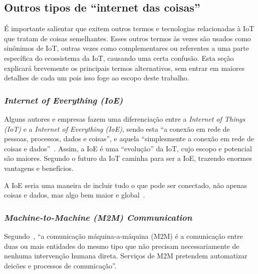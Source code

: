 \documentclass[pdftex, brazil, 12pt, twoside]{article}
\newcommand{\ingles}[1]{\textit{#1}}
\begin{document}
\subsection{Outros tipos de ``internet das coisas''}
\label{o-que-e-iot-outros-tipos}

É importante salientar que exitem outros termos e tecnologias relacionadas à
IoT que tratam de coisas semelhantes. Esses outros termos às vezes são usados
como sinônimos de IoT, outras vezes como complementares ou referentes a uma
parte específica do ecossistema da IoT, causando uma certa confusão. Esta
seção explicará brevemente os principais termos alternativos, sem entrar em
maiores detalhes de cada um pois isso foge ao escopo deste trabalho.


\subsubsection{\ingles{Internet of Everything (IoE)}}
\label{o-que-e-iot-outros-tipos-ioe}

Alguns autores e empresas fazem uma diferenciação entre a \ingles{Internet of Things (IoT)}
e a \ingles{Internet
  of Everything (IoE)}, sendo esta ``a conexão em rede de pessoas, processos,
dados e coisas'', e aquela ``simplesmente a conexão em rede de coisas
e dados''~\citep{CiscoIoEPublicSectorOpportunity,CiscoIoTVS2013,CiscoIoTFAQ2013}.
Assim, a IoE é uma ``evolução'' da IoT, cujo escopo e potencial
são maiores. Segundo \citet{HebraIoTIoE2015} o futuro da IoT caminha para
ser a IoE, trazendo enormes vantagens e benefícios.

A IoE seria uma maneira de incluir tudo o que pode ser conectado, não apenas
coisas e dados, mas algo bem maior e global~\citep{LuethIoT2014,BajarinIoE2014}.


\subsubsection{\ingles{Machine-to-Machine (M2M) Communication}}
\label{o-que-e-iot-outros-tipos-m2m}

Segundo~\citet{IEEEIoTDefinition}, ``a comunicação máquina-a-máquina (M2M) é a
comunicação entre duas ou mais entidades do mesmo tipo que não precisam necessariamente de nenhuma
intervenção humana direta. Serviços de M2M pretendem automatizar deicões
e processos de comunicação''.
\end{document}
